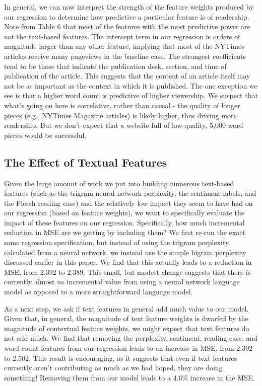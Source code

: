 \documentclass[fleqn,12pt]{SelfArx} %
\begin{document}
In general, we can now interpret the strength of the feature weights produced by our regression to determine how predictive a particular feature is of readership. Note from Table 6 that most of the features with the most predictive power are not the text-based features. The intercept term in our regression is orders of magnitude larger than any other feature, implying that most of the NYTimes articles receive many pageviews in the baseline case. The strongest coefficients tend to be those that indicate the publication desk, section, and time of publication of the article. This suggests that the content of an article itself may not be as important as the context in which it is published. The one exception we see is that a higher word count is predictive of higher viewership. We suspect that what's going on here is correlative, rather than causal - the quality of longer pieces (e.g., NYTimes Magazine articles) is likely higher, thus driving more readership. But we don't expect that a website full of low-quality, 5,000 word pieces would be successful.

\subsection{The Effect of Textual Features}

Given the large amount of work we put into building numerous text-based features (such as the trigram neural network perplexity, the sentiment labels, and the Flesch reading ease) and the relatively low impact they seem to have had on our regression (based on feature weights), we want to specifically evaluate the impact of these features on our regression. Specifically, how much incremental reduction in MSE are we getting by including them? We first re-run the exact same regression specification, but instead of using the trigram perplexity calculated from a neural network, we instead use the simple bigram perplexity discussed earlier in this paper. We find that this actually leads to a reduction in MSE, from 2.392 to 2.389. This small, but modest change suggests that there is currently almost no incremental value from using a neural network language model as opposed to a more straightforward language model.

As a next step, we ask if text features in general add much value to our model. Given that, in general, the magnitude of text feature weights is dwarfed by the magnitude of contextual feature weights, we might expect that text features do not add much. We find that removing the perplexity, sentiment, reading ease, and word count features from our regression leads to an increase in MSE, from 2.392 to 2.502. This result is encouraging, as it suggests that even if text features currently aren't contributing as much as we had hoped, they are doing something! Removing them from our model leads to a 4.6\% increase in the MSE.
\end{document}
